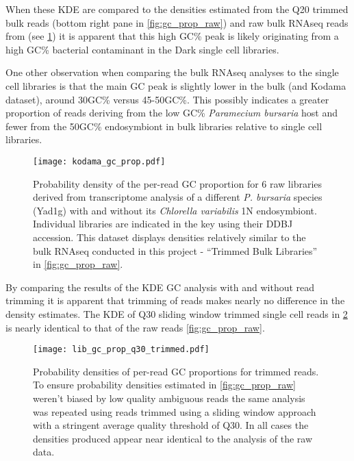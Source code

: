 When these KDE are compared to the densities estimated from the Q20 trimmed
bulk reads (bottom right pane in \cref{fig:gc_prop_raw}) and 
raw bulk RNAseq reads from \citep{Kodama2014} (see \cref{fig:gc_prop_kodama}) 
it is apparent that this high GC\% peak is likely originating from
a high GC\% bacterial contaminant in the Dark single cell libraries.  

One other observation when comparing the bulk RNAseq analyses to the single cell
libraries is that the main GC peak is slightly lower in the bulk (and Kodama dataset), 
around 30GC\% versus 45-50GC\%.
This possibly indicates a greater proportion of reads deriving from the low
GC\% \textit{Paramecium bursaria} host and fewer from the 50GC\% endosymbiont
in bulk libraries relative to single cell libraries.  

\begin{figure}[h!]
	\centering
    \texttt{[image: kodama\_gc\_prop.pdf]}
    \caption[GC densities of \textit{P. bursaria} Yad1g - \textit{C. variabilis} 1N]{Probability density of the per-read GC proportion for 6 raw libraries derived from
        \citep{Kodama2014} transcriptome analysis of a different \textit{P. bursaria} species (Yad1g)
        with and without its \textit{Chlorella variabilis} 1N endosymbiont. Individual libraries are indicated 
        in the key using their DDBJ accession.        
        This dataset displays densities relatively similar
to the bulk RNAseq conducted in this project - ``Trimmed Bulk Libraries'' in \cref{fig:gc_prop_raw}.}
    \label{fig:gc_prop_kodama}
\end{figure}

By comparing the results of the KDE GC analysis with and without read trimming it
is apparent that trimming of reads makes nearly no difference in the density estimates.
The KDE of Q30 sliding window trimmed single cell reads in \cref{fig:gc_prop_q30} is nearly
identical to that of the raw reads \cref{fig:gc_prop_raw}.

\begin{figure}[h!]
    \texttt{[image: lib\_gc\_prop\_q30\_trimmed.pdf]}
    \caption[GC Densities of Bulk Libraries]{Probability densities of per-read GC proportions for trimmed reads.
             To ensure probability densities estimated in \cref{fig:gc_prop_raw}
         weren't biased by low quality ambiguous reads the same analysis was
     repeated using reads trimmed using a sliding window approach with a stringent average
 quality threshold of Q30.  
 In all cases the densities produced appear near identical to
 the analysis of the raw data.}
    \label{fig:gc_prop_q30}
\end{figure}

